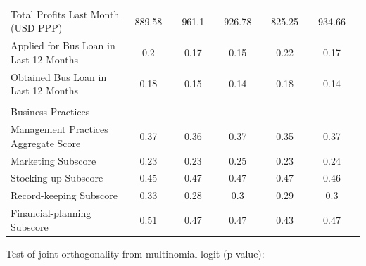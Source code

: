 \documentclass[hideothersubsections, usenames,dvipsnames,11pt]{beamer}
\newenvironment{itemize_2pt}{\itemize\addtolength{\itemsep}{2pt}}{\enditemize}
\begin{document}
\begin{frame}
{{\begin{table}
\begin{tabular}{l*{10}{c}}
Total Profits Last Month (USD PPP)						& 889.58	&& 961.1 &&	926.78	&& 825.25	&& 934.66 \\
Applied for Bus Loan in Last 12 Months
			    & 0.2	&& 0.17	&& 0.15	&& 0.22	&& 0.17 \\
													
Obtained Bus Loan in Last 12 Months
						& 0.18 &&	0.15	&& 0.14	&& 0.18	&& 0.14 \\[0.5ex]
\\
\textcolor{bdf}{Business Practices} \\
Management Practices Aggregate Score											& 0.37	&& 0.36	&& 0.37	&& 0.35	&& 0.37 \\
\hspace{3mm}Marketing Subscore												& 0.23	&& 0.23 &&	0.25	&& 0.23	&& 0.24 \\
\hspace{3mm}Stocking-up	Subscore											& 0.45	&& 0.47	&& 0.47	&& 0.47	&& 0.46 \\
\hspace{3mm}Record-keeping Subscore											& 0.33	&& 0.28	&& 0.3	&& 0.29 &&	0.3 \\
\hspace{3mm}Financial-planning Subscore									& 0.51	&& 0.47	&& 0.47	&& 0.43	&& 0.47 \\
		\hline
			\end{tabular}
		
		
	\end{table}}}

\vspace{-0.5em}

\begin{itemize_2pt}
\item[] \tiny Test of joint orthogonality from multinomial logit (p-value): 
\end{itemize_2pt}
\end{frame}
\end{document}
